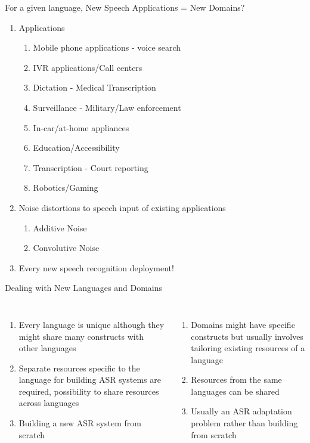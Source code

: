 \begin{frame}{For a given language, New Speech Applications = New Domains?}

\begin{enumerate}
\item \alert{Applications}
\begin{enumerate}
  \item Mobile phone applications - voice search
  \item IVR applications/Call centers
  \item Dictation - Medical Transcription
  \item Surveillance - Military/Law enforcement
  \item In-car/at-home appliances
  \item Education/Accessibility
  \item Transcription - Court reporting
  \item Robotics/Gaming
\end{enumerate}
\item \alert{Noise distortions} to speech input of existing applications
\begin{enumerate}
  \item Additive Noise
  \item Convolutive Noise
\end{enumerate}
\item Every \alert{new} speech recognition deployment!
\end{enumerate}
\end{frame}

\begin{frame}{Dealing with New Languages and Domains}
\begin{columns}[T]
\column{2in}
\centering
{\color{orange}{New Languages}}
\begin{enumerate}
\item Every language is \alert{unique} although they might share many constructs with other languages
\item \alert{Separate resources} specific to the language for building ASR systems are required,
possibility to share resources across languages
\item \alert{Building a new ASR system from scratch}
\end{enumerate}
\column{2in}
\centering
{\color{ForestGreen}{New Domains}}
\begin{enumerate}
\item Domains might have specific constructs but usually involves \alert{tailoring existing resources} of a language
\item Resources from the same languages can be \alert{shared}
\item Usually \alert{an ASR adaptation problem} rather than building from scratch
\end{enumerate}
\end{columns}
\end{frame}

